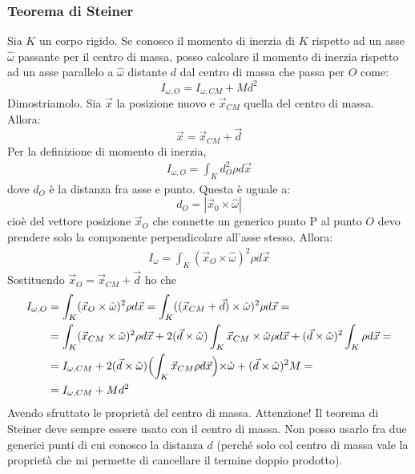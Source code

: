 \documentclass[a4paper,openany]{article}
\begin{document}
	\subsubsection{Teorema di Steiner}
	Sia $K$ un corpo rigido. Se conosco il momento di inerzia di $K$ rispetto ad un asse $\hat{\omega}$ passante per il centro di massa, posso calcolare il momento di inerzia rispetto ad un asse parallelo a $\hat{\omega}$ distante $d$ dal centro di massa che passa per $O$ come:
	$$
	I_{\omega,O} = I_{\omega, CM} + Md^{2}
	$$
	Dimostriamolo. Sia $\vec{x}$ la posizione nuovo e $\vec{x}_{CM}$ quella del centro di massa.
	Allora:
	$$
	\vec{x} = \vec{x}_{CM}+\vec{d}
	$$
	Per la definizione di momento di inerzia,
	\begin{equation}\label{key}
		\begin{aligned}
			I_{\omega,O} = \int_{K}d^2_O \rho d\vec{x}
		\end{aligned}
	\end{equation}
    dove $d_O$ è la distanza fra asse e punto. Questa è uguale a:
    $$
    d_O = |\vec{x}_{0}\times\hat{\omega}|
    $$
    cioè del vettore posizione $\vec{x}_O$ che connette un generico punto P al punto $O$ devo prendere solo la componente perpendicolare all'asse stesso. Allora:
    \begin{equation}\label{key}
    	\begin{aligned}
    		I_{\omega} = \int_{K}(\vec{x}_{O}\times\hat{\omega})^2 \rho d\vec{x}
    	\end{aligned}
    \end{equation}
Sostituendo $\vec{x}_O = \vec{x}_{CM}+\vec{d}$ ho che
    \begin{equation}\label{key}
	\begin{aligned}
		I_{\omega,O} &= \int_{K}(\vec{x}_{O}\times\hat{\omega})^2 \rho d\vec{x} = \int_{K}((\vec{x}_{CM}+\vec{d})\times\hat{\omega})^2 \rho d\vec{x} =  \\
		&= \int_{K}(\vec{x}_{CM}\times\hat\omega)^2\rho d\vec{x} + 2(\vec{d}\times\hat\omega)\int_{K}\vec{x}_{CM}\times\hat\omega\rho d\vec{x} +(\vec{d}\times\hat\omega)^2 \int_{K}\rho d\vec{x} = \\
		&= I_{\omega, CM} + 2(\vec{d}\times\hat\omega)\Bigl(\int_{K}\vec{x}_{CM}\rho d\vec{x}\Bigl) \times \hat\omega+ (\vec{d}\times\hat\omega)^2 M = \\
		&= I_{\omega, CM} + Md^2
	\end{aligned}
\end{equation}
Avendo sfruttato le proprietà del centro di massa. Attenzione! Il teorema di Steiner deve sempre essere usato con il centro di massa. Non posso usarlo fra due generici punti di cui conosco la distanza $d$ (perché solo col centro di massa vale la proprietà che mi permette di cancellare il termine doppio prodotto).
\end{document}
